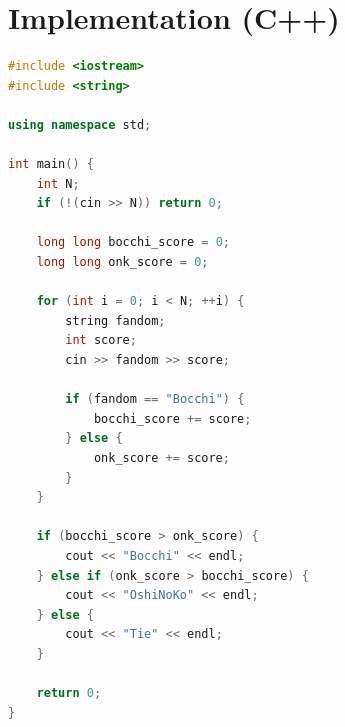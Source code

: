 \documentclass[11pt]{article}
\begin{document}
\section*{Implementation (C++)}

\begin{lstlisting}[language=C++]
#include <iostream>
#include <string>

using namespace std;

int main() {
    int N;
    if (!(cin >> N)) return 0;

    long long bocchi_score = 0;
    long long onk_score = 0;

    for (int i = 0; i < N; ++i) {
        string fandom;
        int score;
        cin >> fandom >> score;

        if (fandom == "Bocchi") {
            bocchi_score += score;
        } else {
            onk_score += score;
        }
    }

    if (bocchi_score > onk_score) {
        cout << "Bocchi" << endl;
    } else if (onk_score > bocchi_score) {
        cout << "OshiNoKo" << endl;
    } else {
        cout << "Tie" << endl;
    }

    return 0;
}
\end{lstlisting}
\end{document}
